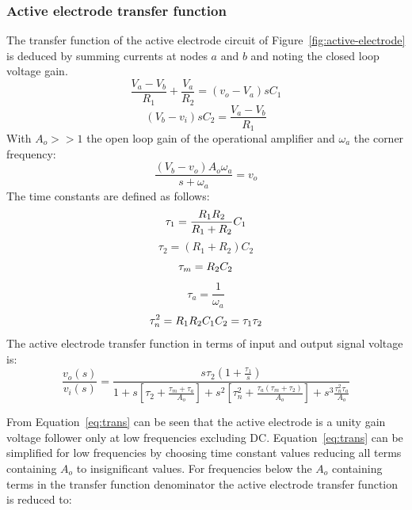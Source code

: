\subsubsection{Active electrode transfer function}
The transfer function of the active electrode circuit of
Figure~\vref{fig:active-electrode} is deduced by summing currents at
nodes $a$ and $b$ and noting the closed loop voltage gain.
\begin{equation}
	\frac{V_a - V_b}{R_1} + \frac{V_a}{R_2} = (v_o - V_a)sC_1
	\label{eq:node-a}
\end{equation}
\begin{equation}
	(V_b - v_i)sC_2 = \frac{V_a - V_b}{R_1}
	\label{eq:node-b}
\end{equation}
With $A_o >> 1$ the open loop gain of the operational amplifier and
$\omega_a$ the corner frequency:
\begin{equation}
	\frac{(V_b - v_o)A_o\omega_a}{s + \omega_a} = v_o
	\label{eq:gain}
\end{equation}
The time constants are defined as follows:
\begin{equation}
	\tau_1 = \frac{R_1\/R_2}{R_1 + R_2}C_1
	\label{eq:tau1}
\end{equation}
\begin{equation}
	\tau_2 = (R_1 + R_2)C_2
	\label{eq:tau2}
\end{equation}
\begin{equation}
	\tau_m = R_2\/C_2
\end{equation}
\begin{equation}
	\tau_a = \frac{1}{\omega_a}
\end{equation}
\begin{equation}
	\tau^2_n = R_1\/R_2\/C_1\/C_2 = \tau_1\/\tau_2
\end{equation}
The active electrode transfer function in terms of input and output
signal voltage is:
\begin{equation}
	\frac{v_o(s)}{v_i(s)} = 
	\frac{s\tau_2(1 + \frac{\tau_1}{s})}{1 + s[\tau_2 + \frac{\tau_m +
	\tau_a}{A_o}] + s^2[\tau^2_n + \frac{\tau_a(\tau_m + \tau_2)}{A_o}] +
	s^3\frac{\tau^2_n\tau_a}{A_o}}
	\label{eq:trans}
\end{equation}

From Equation~\ref{eq:trans} can be seen that the active electrode is
a unity gain voltage follower only at low frequencies excluding
DC. Equation~\ref{eq:trans} can be simplified for low frequencies by
choosing time constant values reducing all terms containing $A_o$ to
insignificant values. For frequencies below the $A_o$ containing terms
in the transfer function denominator the active electrode transfer
function is reduced to:

